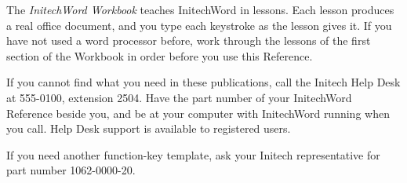 The \textit{InitechWord Workbook} teaches InitechWord in lessons.  Each
lesson produces a real office document, and you type each keystroke as the
lesson gives it.  If you have not used a word processor before, work through
the lessons of the first section of the Workbook in order before you use
this Reference.

If you cannot find what you need in these publications, call the Initech
Help Desk at 555-0100, extension 2504.  Have the part number of your
InitechWord Reference beside you, and be at your computer with InitechWord
running when you call.  Help Desk support is available to registered users.

If you need another function-key template, ask your Initech representative
for part number 1062-0000-20.
